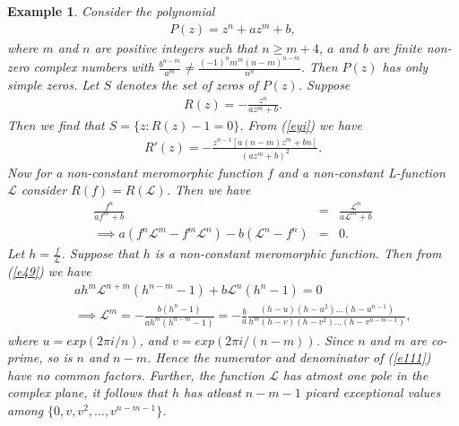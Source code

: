 \documentclass[a4paper,draft]{amsproc}
\theoremstyle{plain}
\newtheorem{exm}{Example}[section]
\theoremstyle{definition}
\theoremstyle{remark}
\newcommand{\bea}{\begin{eqnarray}}
\newcommand{\eea}{\end{eqnarray}}
\numberwithin{equation}{section}
\begin{document}
\begin{exm}\label{ex5}
	Consider the polynomial \bea\nonumber  P(z) = z^n + az^m + b,\eea where $m$ and $n$ are positive integers such that $n \geq m+4$, $a$ and $b$ are finite non-zero complex numbers with $\frac{b^{n-m}}{a^m}\ne \frac{(-1)^nm^m(n-m)^{n-m}}{n^n}$. Then $P(z)$ has only simple zeros. Let $S$ denotes the set of zeros of $P(z)$. Suppose \bea\label{eyi} 
	R(z)=- \frac{z^n}{az^m+b}.\eea
	Then we find that $S=\{z:R(z)-1=0\}$.
	From (\ref{eyi}) we have \bea \nonumber
	R'(z)=- \frac{z^{n-1}[a(n-m)z^m+bn]}{(az^m+b)^2}.\eea 
	Now for a non-constant meromorphic function $f$ and a non-constant L-function $\mathcal{L}$ consider $R(f)=R(\mathcal{L})$. Then we have  \bea\label{e49} 
	\frac{f^n}{af^m+b}&=&\frac{\mathcal{L}^n}{a\mathcal{L}^m+b}\nonumber\\
	\implies a(f^n\mathcal{L}^m-f^m\mathcal{L}^n)-b(\mathcal{L}^n-f^n)&=&0.\eea
	Let   $h=\frac{f}{\mathcal{L}}$. Suppose that $h $ is a non-constant meromorphic function. Then from (\ref{e49}) we have
	\bea \label{e111}&&
	ah^{m}\mathcal{L}^{n+m}(h^{n-m}-1)+b\mathcal{L}^n(h^n-1)=0\\\nonumber&&
	\implies \mathcal{L}^m=-\frac{b(h^n-1)}{ah^{m}(h^{n-m}-1)}=-\frac{b}{a}\frac{(h-u)(h-u^2)...(h-u^{n-1})}{h^m(h-v)(h-v^2)...(h-v^{n-m-1})},
	\eea
	where  $u = exp(2\pi i/n)$, and $v = exp(2\pi i/(n-m))$. Since $n$ and $m$ are co-prime, so is $n$ and $n-m$. Hence the numerator and denominator of (\ref{e111}) have no common factors. Further, the function $\mathcal{L}$ has atmost one pole  in
	the complex plane, it follows that $h$ has atleast $n-m-1$ picard exceptional values among $\{0,v,v^2,...,v^{n-m-1}\}$.
	

\end{exm}
\end{document}
